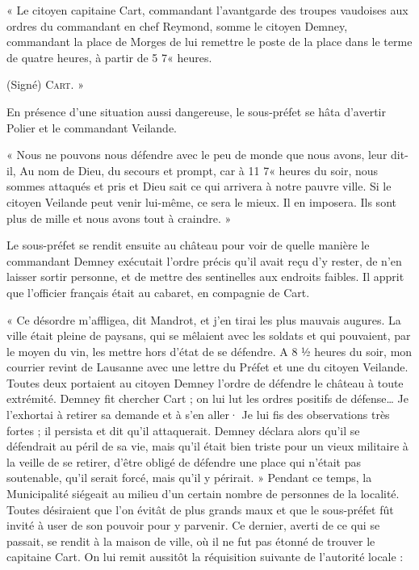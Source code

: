 \documentclass[french,twoside]{book} %
\newenvironment{quoteblock}%
  {\begin{quoting}}
  {\end{quoting}}
\newenvironment{quotebar}{%
    \def\FrameCommand{{\color{rubric!10!}\vrule width 0.5em} \hspace{0.9em}}%
    \def\OuterFrameSep{\itemsep} %
    \MakeFramed {\advance\hsize-\width \FrameRestore}
  }%
  {%
    \endMakeFramed
  }
\renewenvironment{quoteblock}%
  {%
    \savenotes
    \setstretch{0.9}
    \begin{quotebar}
  }
  {%
    \end{quotebar}
    \spewnotes
  }
\begin{document}
\begin{quoteblock}
 \noindent « Le citoyen capitaine Cart, commandant l’avantgarde des troupes vaudoises aux ordres du commandant en chef Reymond, somme le citoyen Demney, commandant la place de Morges de lui remettre le poste de la place dans le terme de quatre heures, à partir de 5 7« heures.\par
 (Signé) {\scshape Cart. »}
 \end{quoteblock}

\noindent En présence d’une situation aussi dangereuse, le sous-préfet se hâta d’avertir Polier et le commandant Veilande.\par

\begin{quoteblock}
 \noindent « Nous ne pouvons nous défendre avec le peu de monde que nous avons, leur dit-il, Au nom de Dieu, du secours et prompt, car à 11 7« heures du soir, nous sommes attaqués et pris et Dieu sait ce qui arrivera à notre pauvre ville. Si le citoyen Veilande peut venir lui-même, ce sera le mieux. Il en imposera. Ils sont plus de mille et nous avons tout à craindre. »
 \end{quoteblock}

\noindent Le sous-préfet se rendit ensuite au château pour voir de quelle manière le commandant Demney exécutait l’ordre précis qu’il avait reçu d’y rester, de n’en laisser sortir personne, et de mettre des sentinelles aux endroits faibles. Il apprit que l’officier français était au cabaret, en compagnie de Cart.\par
« Ce désordre m’affligea, dit Mandrot, et j’en tirai les plus mauvais augures. La ville était pleine de paysans, qui se mêlaient avec les soldats et qui pouvaient, par le moyen du vin, les mettre hors d’état de se défendre. A 8 ½ heures du soir, mon courrier revint de Lausanne avec une lettre du Préfet et une du citoyen Veilande. Toutes deux portaient au citoyen Demney l’ordre de défendre le château à toute extrémité. Demney fit chercher Cart ; on lui lut les ordres positifs de défense… Je l’exhortai à retirer sa demande et à s’en aller· Je lui fis des observations très fortes ; il persista et dit qu’il attaquerait. Demney déclara alors qu’il se défendrait au péril de sa vie, mais qu’il était bien triste pour un vieux militaire à la veille de se retirer, d’être obligé de défendre une place qui n’était pas soutenable, qu’il serait forcé, mais qu’il y périrait. » Pendant ce temps, la Municipalité siégeait au milieu d’un certain nombre de personnes de la localité. Toutes désiraient que l’on évitât de plus grands maux et que le sous-préfet fût invité à user de son pouvoir pour y parvenir. Ce dernier, averti de ce qui se passait, se rendit à la maison de ville, où il ne fut pas étonné de trouver le capitaine Cart. On lui remit aussitôt la réquisition suivante de l’autorité locale :\par
\end{document}
